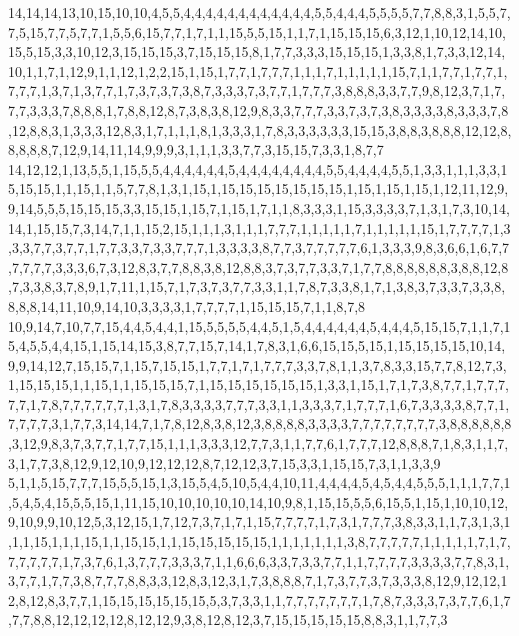 14,14,14,13,10,15,10,10,4,5,5,4,4,4,4,4,4,4,4,4,4,4,4,5,5,4,4,4,5,5,5,5,7,7,8,8,3,1,5,5,7,7,5,15,7,7,5,7,7,1,5,5,6,15,7,7,1,7,1,1,15,5,5,15,1,1,7,1,15,15,15,6,3,12,1,10,12,14,10,15,5,15,3,3,10,12,3,15,15,15,3,7,15,15,15,8,1,7,7,3,3,3,15,15,15,1,3,3,8,1,7,3,3,12,14,10,1,1,7,1,12,9,1,1,12,1,2,2,15,1,15,1,7,7,1,7,7,7,1,1,1,7,1,1,1,1,1,15,7,1,1,7,7,1,7,7,1,7,7,7,1,3,7,1,3,7,7,1,7,3,7,3,7,3,8,7,3,3,3,7,3,7,7,1,7,7,7,3,8,8,8,3,3,7,7,9,8,12,3,7,1,7,7,7,3,3,3,7,8,8,8,1,7,8,8,12,8,7,3,8,3,8,12,9,8,3,3,7,7,7,3,3,7,3,7,3,8,3,3,3,3,8,3,3,3,7,8,12,8,8,3,1,3,3,3,12,8,3,1,7,1,1,1,8,1,3,3,3,1,7,8,3,3,3,3,3,3,15,15,3,8,8,3,8,8,8,12,12,8,8,8,8,8,7,12,9,14,11,14,9,9,9,3,1,1,1,3,3,7,7,3,15,15,7,3,3,1,8,7,7
14,12,12,1,13,5,5,1,15,5,5,4,4,4,4,4,4,5,4,4,4,4,4,4,4,4,5,5,4,4,4,4,5,5,1,3,3,1,1,1,3,3,15,15,15,1,1,15,1,1,5,7,7,8,1,3,1,15,1,15,15,15,15,15,15,15,1,15,1,15,1,15,1,12,11,12,9,9,14,5,5,5,15,15,15,3,3,15,15,1,15,7,1,15,1,7,1,1,8,3,3,3,1,15,3,3,3,3,7,1,3,1,7,3,10,14,14,1,15,15,7,3,14,7,1,1,15,2,15,1,1,1,3,1,1,1,7,7,7,1,1,1,1,1,7,1,1,1,1,1,15,1,7,7,7,7,1,3,3,3,7,7,3,7,7,1,7,7,3,3,7,3,3,7,7,7,1,3,3,3,3,8,7,7,3,7,7,7,7,7,6,1,3,3,3,9,8,3,6,6,1,6,7,7,7,7,7,7,3,3,3,6,7,3,12,8,3,7,7,8,8,3,8,12,8,8,3,7,3,7,7,3,3,7,1,7,7,8,8,8,8,8,8,3,8,8,12,8,7,3,3,8,3,7,8,9,1,7,11,1,15,7,1,7,3,7,3,7,7,3,3,1,1,7,8,7,3,3,8,1,7,1,3,8,3,7,3,3,7,3,3,8,8,8,8,14,11,10,9,14,10,3,3,3,3,1,7,7,7,7,1,15,15,15,7,1,1,8,7,8
10,9,14,7,10,7,7,15,4,4,5,4,4,1,15,5,5,5,5,4,4,5,1,5,4,4,4,4,4,4,5,4,4,4,5,15,15,7,1,1,7,15,4,5,5,4,4,15,1,15,14,15,3,8,7,7,15,7,14,1,7,8,3,1,6,6,15,15,5,15,1,15,15,15,15,10,14,9,9,14,12,7,15,15,7,1,15,7,15,15,1,7,7,1,7,1,7,7,7,3,3,7,8,1,1,3,7,8,3,3,15,7,7,8,12,7,3,1,15,15,15,1,1,15,1,1,15,15,15,7,1,15,15,15,15,15,15,1,3,3,1,15,1,7,1,7,3,8,7,7,1,7,7,7,7,7,1,7,8,7,7,7,7,7,7,1,3,1,7,8,3,3,3,3,7,7,7,3,3,1,1,3,3,3,7,1,7,7,7,1,6,7,3,3,3,3,8,7,7,1,7,7,7,7,3,1,7,7,3,14,14,7,1,7,8,12,8,3,8,12,3,8,8,8,8,3,3,3,3,7,7,7,7,7,7,7,7,3,8,8,8,8,8,8,3,12,9,8,3,7,3,7,7,1,7,7,15,1,1,1,3,3,3,12,7,7,3,1,1,7,7,6,1,7,7,7,12,8,8,8,7,1,8,3,1,1,7,3,1,7,7,3,8,12,9,12,10,9,12,12,12,8,7,12,12,3,7,15,3,3,1,15,15,7,3,1,1,3,3,9
5,1,1,5,15,7,7,7,15,5,5,15,1,3,15,5,4,5,10,5,4,4,10,11,4,4,4,4,5,4,5,4,4,5,5,5,1,1,1,7,7,1,5,4,5,4,15,5,5,15,1,11,15,10,10,10,10,10,14,10,9,8,1,15,15,5,5,6,15,5,1,15,1,10,10,12,9,10,9,9,10,12,5,3,12,15,1,7,12,7,3,7,1,7,1,15,7,7,7,7,1,7,3,1,7,7,7,3,8,3,3,1,1,7,3,1,3,1,1,1,15,1,1,1,15,1,1,15,15,1,1,15,15,15,15,15,1,1,1,1,1,1,1,3,8,7,7,7,7,7,1,1,1,1,1,7,1,7,7,7,7,7,7,1,7,3,7,6,1,3,7,7,7,3,3,3,7,1,1,6,6,6,3,3,7,3,3,7,7,1,1,7,7,7,7,3,3,3,3,7,7,8,3,1,3,7,7,1,7,7,3,8,7,7,7,8,8,3,3,12,8,3,12,3,1,7,3,8,8,8,7,1,7,3,7,7,3,7,3,3,3,8,12,9,12,12,12,8,12,8,3,7,7,1,15,15,15,15,15,15,5,3,7,3,3,1,1,7,7,7,7,7,7,7,1,7,8,7,3,3,3,7,3,7,7,6,1,7,7,7,8,8,12,12,12,12,8,12,12,9,3,8,12,8,12,3,7,15,15,15,15,15,8,8,3,1,1,7,7,3

